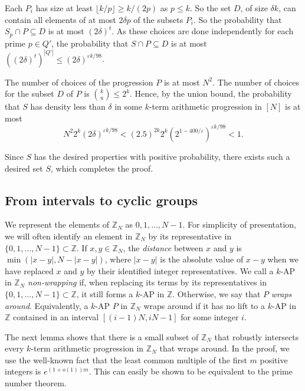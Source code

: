 \documentclass[11pt]{article}
\makeatletter
\numberwithin{equation}{section}
\renewenvironment{proof}[1][\proofname]{\par
  \vspace{-\topsep}%
  \pushQED{\qed}%
  \normalfont
  \topsep0pt \partopsep0pt %
  \trivlist
  \item[\hskip\labelsep
        \itshape
    #1\@addpunct{.}]\ignorespaces
}{%
  \popQED\endtrivlist\@endpefalse
  \addvspace{6pt plus 6pt} %
}
\theoremstyle{definition}
\theoremstyle{remark}
\makeatother
\begin{document}
\begin{proof}
Each $P_i$ has size at least $\lfloor k/p \rfloor \geq k/(2p)$ as $p \leq k$. So the set $D$, of size $\delta k$, can contain all elements of at most $2\delta p$ of the subsets $P_i$. So the probability that $S_p \cap P \subseteq D$ is at most $(2\delta)^t$. As these choices are done independently for each prime $p \in Q'$, the probability that $S \cap P \subseteq D$ is at most $((2\delta)^t)^{|Q'|} \leq (2\delta)^{\varepsilon k/98}$. 

The number of choices of the progression $P$ is at most $N^2$. The number of choices for the subset $D$ of $P$ is ${k \choose u} \leq 2^k$. Hence, by the union bound, the probability that $S$ has density less than $\delta$ in some $k$-term arithmetic progression in $[N]$ is at most $$N^2 2^k (2\delta)^{\varepsilon k/98}<(2.5)^{2k}2^k(2^{1-400/\varepsilon})^{\varepsilon k/98}<1.$$

Since $S$ has the desired properties with positive probability, there exists such a desired set $S$, which completes the proof. 
\end{proof}


\subsection{From intervals to cyclic groups}\label{subsect:cyclicfrom}

We represent the elements of $\mathbb{Z}_N$ as $0,1,\ldots,N-1$. For simplicity of presentation, we will often identify an element in $\mathbb{Z}_N$ by its representative in $\{0,1,\ldots,N-1\}\subset \mathbb{Z}$. If $x,y \in \mathbb{Z}_N$, the {\it distance} between $x$ and $y$ is $\min(|x-y|,N-|x-y|)$, where $|x-y|$ is the absolute value of $x-y$ when we have replaced $x$ and $y$ by their identified integer representatives. We call a $k$-AP in $\mathbb{Z}_N$ {\it non-wrapping} if, when replacing its terms by its representatives in $\{0,1,\ldots,N-1\} \subset \mathbb{Z}$, it still forms a $k$-AP in $\mathbb{Z}$.  Otherwise, we say that $P$ {\it wraps around}. Equivalently, a $k$-AP $P$ in $\mathbb{Z}_N$ wraps around if it has no lift to a $k$-AP in $\mathbb{Z}$ contained in an interval $[(i-1)N,iN-1]$ for some integer $i$.

The next lemma shows that there is a small subset of $\mathbb{Z}_N$ that robustly intersects every $k$-term arithmetic progression in $\mathbb{Z}_N$ that wraps around. In the proof, we use the well-known fact that the least common multiple of the first $m$ positive integers is $e^{(1+o(1))m}$. This can easily be shown to be equivalent to the prime number theorem. 
\end{document}

